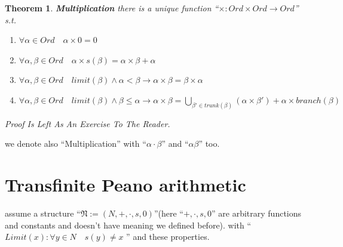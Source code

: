 \documentclass[10pt,a4paper]{book}
\newtheorem{theorem}{Theorem}[section]
\begin{document}
\begin{theorem}\textbf{Multiplication} there is a unique function ``$\times :Ord \times Ord \to Ord$'' s.t.

    \begin{enumerate}
        \setlength{\itemsep}{0pt} %
        \item       $\forall \alpha  \in Ord \quad \alpha  \times 0 = 0$
        \item       $\forall \alpha , \beta  \in Ord \quad \alpha  \times s( \beta ) = \alpha  \times  \beta + \alpha    $
        \item       $\forall \alpha , \beta  \in Ord \quad limit(\beta) \land \alpha < \beta \to \alpha \times  \beta = \beta  \times \alpha  $
        \item       $\forall \alpha , \beta  \in Ord \quad limit(\beta) \land  \beta \leq \alpha  \to \alpha \times \beta = \bigcup_{\beta' \in trunk( \beta)}(\alpha \times \beta' ) + \alpha \times branch( \beta) $
    \end{enumerate}
    Proof Is Left As An Exercise To The Reader.
\end{theorem}
we denote also ``Multiplication'' with ``$\alpha  \cdot  \beta $'' and ``$\alpha  \beta$'' too.

\section{Transfinite Peano arithmetic}

assume a structure ``$\mathfrak{N} := (N , + , \cdot , s , 0)$''(here ``$+ ,
    \cdot , s , 0 $'' are arbitrary functions and constants and doesn't have
meaning we defined before). with ``$ Limit(x) : \forall y \in N \quad s(y)
    \not= x $ '' and these properties.
\end{document}
